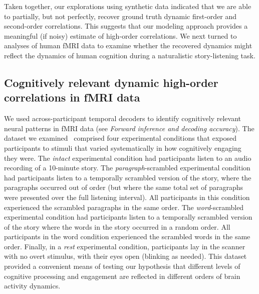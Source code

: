 \documentclass[english]{article}
\begin{document}
Taken together, our explorations using synthetic data indicated that
we are able to partially, but not perfectly, recover ground truth
dynamic first-order and second-order correlations.  This suggests that
our modeling approach provides a meaningful (if noisy) estimate of
high-order correlations.  We next turned to analyses of human fMRI data
to examine whether the recovered dynamics might reflect the dynamics
of human cognition during a naturalistic story-listening task.

\subsection*{Cognitively relevant dynamic high-order correlations in
  fMRI data}
We used across-participant temporal decoders to identify cognitively
relevant neural patterns in fMRI data (see \textit{Forward inference
  and decoding accuracy}).  The dataset we examined~\citep[collected
by][]{SimoEtal16} comprised four experimental conditions that exposed
participants to stimuli that varied systematically in how cognitively
engaging they were.  The \textit{intact} experimental condition had
participants listen to an audio recording of a 10-minute story.  The
\textit{paragraph}-scrambled experimental condition had participants
listen to a temporally scrambled version of the story, where the
paragraphs occurred out of order (but where the same total set of
paragraphs were presented over the full listening interval).  All
participants in this condition experienced the scrambled paragraphs in
the same order.  The \textit{word}-scrambled experimental condition
had participants listen to a temporally scrambled version of the story
where the words in the story occurred in a random order.  All
participants in the word condition experienced the scrambled words in
the same order.  Finally, in a \textit{rest} experimental condition,
participants lay in the scanner with no overt stimulus, with their
eyes open (blinking as needed).  This dataset provided a convenient
means of testing our hypothesis that different levels of cognitive
processing and engagement are reflected in different orders of brain
activity dynamics.
\end{document}
